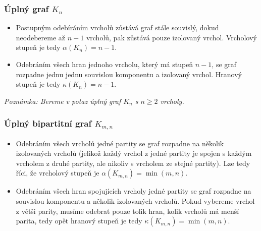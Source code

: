 \documentclass[10pt, a4paper]{ReportSheet}
\begin{document}
    \subsubsection{Úplný graf $K_n$}
    \begin{itemize}
        \item Postupným odebíráním vrcholů zůstává graf stále souvislý, dokud neodebereme až $n-1$ vrcholů, pak zůstává pouze izolovaný vrchol. Vrcholový stupeň je tedy $\alpha(K_n) = n-1$.
        \item Odebráním všech hran jednoho vrcholu, který má stupeň $n-1$, se graf rozpadne jednu jednu souvislou
        komponentu a izolovaný vrchol. Hranový stupeň je tedy $\kappa(K_n) = n-1$.
    \end{itemize}
    \textit{Poznámka: Bereme v potaz úplný graf $K_n$ s $n \geq 2$ vrcholy.}

    \subsubsection{Úplný bipartitní graf $K_{m,n}$}
    \begin{itemize}
        \item Odebráním všech vrcholů jedné partity se graf rozpadne na několik izolovaných vrcholů (jelikož každý
        vrchol z jedné partity je spojen s každým vrcholem z druhé partity, ale nikoliv s vrcholem ze stejné partity). Lze tedy říci, že vrcholový stupeň je $\alpha(K_{m,n}) = \min(m, n)$.
        \item Odebráním všech hran spojujících vrcholy jedné partity se graf rozpadne na souvislou komponentu a
        několik izolovaných vrcholů. Pokud vybereme vrchol z větši parity, musíme odebrat pouze tolik hran, kolik
        vrcholů má menší parita, tedy opět hranový stupeň je tedy $\kappa(K_{m,
        n}) = \min(m, n)$.
    \end{itemize}

    \newpage

    \newpage
\end{document}

